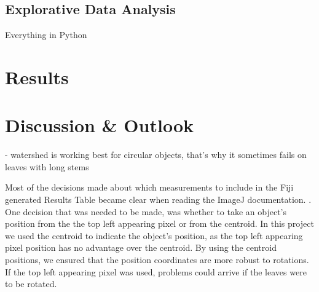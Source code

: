 \documentclass[paper=A4,bibliography=totocnumbered]{scrartcl}
\begin{document}
\subsection{Explorative Data Analysis}
Everything in Python

\section{Results}


\section{Discussion \& Outlook}
- watershed is working best for circular objects, that's why it sometimes fails on leaves with long stems

Most of the decisions made about which measurements to include in the Fiji generated Results Table became clear when reading the ImageJ documentation. \citep{Ferreira.2012}. One decision that was needed to be made, was whether to take an object's position from the the top left appearing pixel or from the centroid. In this project we used the centroid to indicate the object's position, as the top left appearing pixel position has no advantage over the centroid. By using the centroid positions, we ensured that the position coordinates are more robust to rotations. If the top left appearing pixel was used, problems could arrive if the leaves were to be rotated. 



\renewcommand\bibname{References} %

\end{document}
